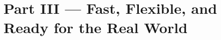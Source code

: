 \documentclass[10pt,aspectratio=169]{beamer}
\newcommand{\currentpresenter}{}
\newcommand{\setpresenter}[1]{\renewcommand{\currentpresenter}{#1}}
\begin{document}


\setpresenter{Wasif --- Complexity, Extensions \& Applications}
\section{Part III --- Fast, Flexible, and Ready for the Real World}
\end{document}
